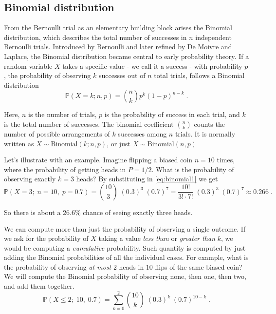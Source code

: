 \documentclass{book}
\begin{document}
\subsection*{Binomial distribution}

From the Bernoulli trial as an elementary building block arises the Binomial distribution, which describes the total number of successes in $n$ independent Bernoulli trials. Introduced by Bernoulli and later refined by De Moivre and Laplace, the Binomial distribution became central to early probability theory. If a random variable $X$ takes a specific value - we call it a success - with probability $p$, the probability of observing $k$ successes out of $n$ total trials, follows a Binomial distribution
\begin{equation}
	\mathbb{P}(X = k; n, p) = \binom{n}{k} p^k (1 - p)^{n - k} \; .
	\label{eq:binomial1}
\end{equation}

Here, $n$ is the number of trials, $p$ is the probability of success in each trial, and $k$ is the total number of successes. The binomial coefficient $\binom{n}{k}$ counts the number of possible arrangements of $k$ successes among $n$ trials. It is normally written as $X \sim \text{Binomial}(k; n, p)$, or just $X \sim \text{Binomial}(n, p)$

\medskip

Let's illustrate with an example. Imagine flipping a biased coin $n=10$ times, where the probability of getting heads in $P = 1/2$. What is the probability of observing exactly $k=3$ heads? By substituting in \eqref{eq:binomial1} we get
\begin{equation}
	\mathbb{P}(X = 3; \; n = 10, \; p = 0.7) = \binom{10}{3} \; (0.3)^3 \; (0.7)^7 \nonumber = \frac{10!}{3! \cdot 7!} \; (0.3)^3 \; (0.7)^7 \approx 0.266 \; . \nonumber
\end{equation}

So there is about a 26.6\% chance of seeing exactly three heads.

\medskip

We can compute more than just the probability of observing a single outcome. If we ask for the probability of $X$ taking a value \textit{less than} or \textit{greater than} $k$, we would be computing a \textit{cumulative} probability. Such quantity is computed by just adding the Binomial probabilities of all the individual cases. For example, what is the probability of observing \textit{at most} $2$ heads in $10$ flips of the same biased coin? We will compute the Binomial probability of observing none, then one, then two, and add them together.
\begin{equation}
	\mathbb{P}(X \leq 2; \; 10, \; 0.7) = \sum_{k=0}^2 \binom{10}{k} \; (0.3)^k \; (0.7)^{10-k} \; . \nonumber
\end{equation}
\end{document}

